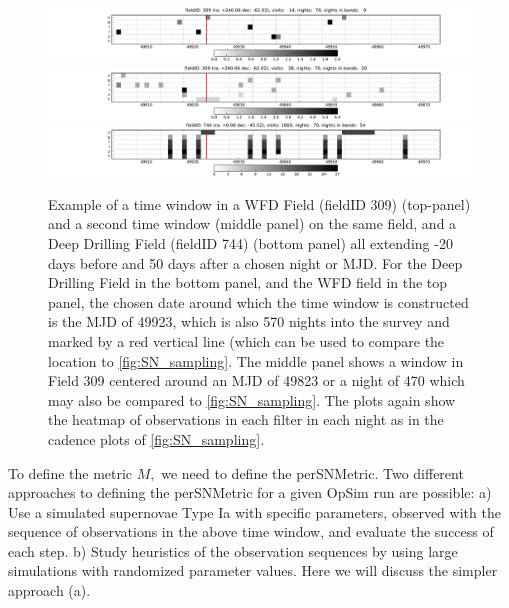 \begin{figure}
\centering
 \includegraphics[width=\textwidth]{figs/supernova/TimeWindow_309_49923.pdf}
 \includegraphics[width=\textwidth]{figs/supernova/TimeWindow_309_49823.pdf}
 \includegraphics[width=\textwidth]{figs/supernova/TimeWindow_744_49923.pdf}
 \caption{Example of a time window in a WFD Field (fieldID 309)
 (top-panel) and a second time window (middle panel) on the same field,
 and a Deep Drilling Field (fieldID 744) (bottom panel) all extending
 -20 days before and 50 days after a chosen night or MJD. For the Deep
 Drilling Field in the bottom panel, and the WFD field in the top
 panel, the chosen date around which the time window is constructed is
 the MJD of 49923, which is also 570 nights into the survey and marked
 by a red vertical line (which can be used to compare the location to
 \autoref{fig:SN_sampling}. The middle panel shows a window in Field
 309 centered around an MJD of 49823 or a night of 470 which may also be
 compared to \autoref{fig:SN_sampling}. The plots again show the
 heatmap of observations in each filter in each night as in the cadence
 plots of \autoref{fig:SN_sampling}.}
  \label{fig:TimeWindow}
\end{figure}

To define the metric $M,$ we need to define the perSNMetric. Two
different approaches to defining the perSNMetric for a given OpSim run are possible: a) Use
a simulated supernovae Type Ia with specific parameters, observed with
the sequence of observations in the above time window, and evaluate the
success of each step. b) Study heuristics of the observation sequences by using large simulations
with randomized parameter values. Here we will discuss the simpler approach (a).

